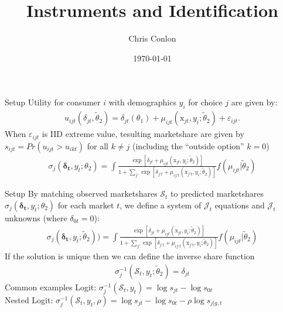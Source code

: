 \documentclass[xcolor=pdftex,dvipsnames,table,mathserif,aspectratio=169]{beamer}
\begin{document}
\title{Instruments and Identification }
\author{Chris Conlon}
\date{\today}

\frame{\titlepage}


\begin{frame}{Setup}
Utility for consumer $i$ with demographics $y_i$ for choice $j$ are given by:
\begin{align*}
\label{eq:utility}
u_{ijt}(\delta_{jt},\widetilde{\theta}_2) =  \delta_{jt}(\theta_1)  + \mu_{ijt}(\textrm{x}_{jt}, y_i; \widetilde{\theta}_2) + \varepsilon_{ijt}.
\end{align*}
When $\varepsilon_{ijt}$ is IID extreme value, tesulting marketshare are given by $s_{ijt} = Pr(u_{ijt}> u_{ikt})$ for all $k\neq j$ (including the ``outside option'' $k=0$)
\begin{align*}
\sigma_j(\boldsymbol{\delta_t},y_t;\theta_2)=\int \frac{\exp[\delta_{jt}+\mu_{ijt}(\textrm{x}_{jt}, y_i; \widetilde{\theta}_2)]}{1+\sum_{j'} \exp[\delta_{j't}+\mu_{ij't}(\textrm{x}_{j't}, y_i; \widetilde{\theta}_2)]}f(\mu_{ijt} | \widetilde{\theta}_2)
\end{align*}
\end{frame}


\begin{frame}{Setup}
By matching observed marketshares $\mathcal{S}_t$ to predicted marketshares $\sigma_j(\boldsymbol{\delta_t},y_t;\theta_2)$ for each market $t$, we define a system of $\mathcal{J}_t$ equations and $\mathcal{J}_t$ unknowns (where $\delta_{0t}=0$):
\begin{align*}
\sigma_j(\boldsymbol{\delta_t},y_t;\widetilde{\theta}_2))=\int \frac{\exp[\delta_{jt}+\mu_{ijt}(\textrm{x}_{jt}, y_i; \widetilde{\theta}_2)]}{1+\sum_{j'} \exp[\delta_{j't}+\mu_{ij't}(\textrm{x}_{j't}, y_i; \widetilde{\theta}_2)]}f(\mu_{ijt} | \widetilde{\theta}_2)
\end{align*}
If the solution is unique then we can define the \alert{inverse share function}
\begin{align*}
\sigma_j^{-1}(\mathcal{S}_t,y_t;\widetilde{\theta}_2)=\delta_{jt}
\end{align*}
Common examples Logit: $\sigma_j^{-1}(\mathcal{S}_t,y_t)=\log s_{jt}- \log s_{0t}$\\
Nested Logit: $\sigma_j^{-1}(\mathcal{S}_t,y_t, \rho)=\log s_{jt}- \log s_{0t}- \rho \log s_{j |g, t}$
\end{frame}
\end{document}
